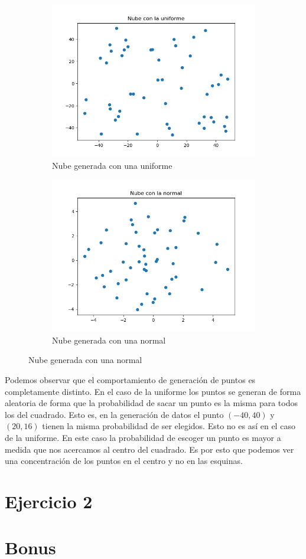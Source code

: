 \documentclass[12pt,a4paper]{article}
\begin{document}
\begin{figure}
	\centering
	\begin{subfigure}{0.47\textwidth}
		\includegraphics[scale=0.55]{./Imagenes/ej1-1.png}
		\caption{Nube generada con una uniforme}
	\end{subfigure}
	\begin{subfigure}{0.47\textwidth}
		\includegraphics[scale=0.55]{./Imagenes/ej1-2.png}
		\caption{Nube generada con una normal}
	\end{subfigure}
\end{figure}

Podemos observar que el comportamiento de generación de puntos es completamente distinto. En el caso de la uniforme los puntos se generan de forma aleatoria de forma que la probabilidad de sacar un punto es la misma para todos los del cuadrado. Esto es, en la generación de datos el punto $(-40,40)$ y $(20,16)$ tienen la misma probabilidad de ser elegidos. Esto no es así en el caso de la uniforme. En este caso la probabilidad de escoger un punto es mayor a medida que nos acercamos al centro del cuadrado. Es por esto que podemos ver una concentración de los puntos en el centro y no en las esquinas.

\section{Ejercicio 2}

\section{Bonus}
\end{document}
